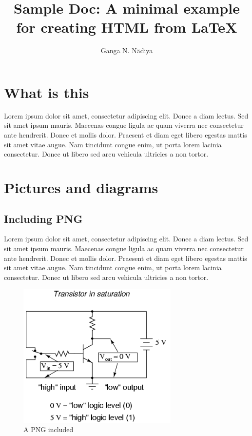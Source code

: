 \documentclass[12pt,a4paper,twoside]{article}
\begin{document}
\title{Sample Doc: A minimal example for creating HTML from LaTeX}

\author{Ganga N. N\"adiya}

\thispagestyle{empty}
\maketitle

\setcounter{tocdepth}{1}
\tableofcontents

\section{What is this}
Lorem ipsum dolor sit amet, consectetur adipiscing elit. Donec a diam
lectus. Sed sit amet ipsum mauris. Maecenas congue ligula ac quam
viverra nec consectetur ante hendrerit. Donec et mollis dolor. Praesent
et diam eget libero egestas mattis sit amet vitae augue. Nam tincidunt
congue enim, ut porta lorem lacinia consectetur. Donec ut libero sed
arcu vehicula ultricies a non tortor. 

\section{Pictures and diagrams}

\subsection{Including PNG}
Lorem ipsum dolor sit amet, consectetur adipiscing elit. Donec a diam
lectus. Sed sit amet ipsum mauris. Maecenas congue ligula ac quam
viverra nec consectetur ante hendrerit. Donec et mollis dolor. Praesent
et diam eget libero egestas mattis sit amet vitae augue. Nam tincidunt
congue enim, ut porta lorem lacinia consectetur. Donec ut libero sed
arcu vehicula ultricies a non tortor. 

\begin{figure}[htb]
  \begin{center}
    \includegraphics[width=80mm]{images/04068}
    \caption{A PNG included}
  \end{center}
\end{figure}
\end{document}
